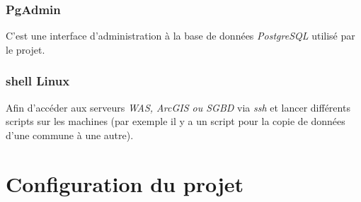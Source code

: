 \subsection{PgAdmin} C'est une interface d'administration à la base de données \textit{PostgreSQL} utilisé par le projet.
\subsection{shell Linux} Afin d'accéder aux serveurs \textit{WAS, ArcGIS ou SGBD} via \textit{ssh} et lancer différents scripts sur les machines (par exemple il y a un script pour la copie de données d'une commune à une autre).

\chapter{Configuration du projet}
